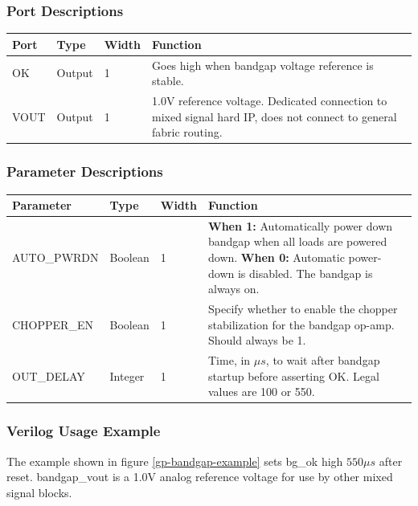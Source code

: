 \documentclass{article}
\begin{document}
\subsubsection{Port Descriptions}

\begin{tabularx}{5in}{|l|l|l|X|}
\hline
{\bfseries Port} & {\bfseries Type} & {\bfseries Width} & {\bfseries Function} \\
\hline
OK & Output & 1 & Goes high when bandgap voltage reference is stable. \\
\hline
VOUT & Output & 1 & 1.0V reference voltage.
	Dedicated connection to mixed signal hard IP, does not connect to general fabric routing. \\
\hline
\end{tabularx}

\subsubsection{Parameter Descriptions}

\begin{tabularx}{5in}{|l|l|l|X|}
\hline
{\bfseries Parameter} & {\bfseries Type} & {\bfseries Width} & {\bfseries Function} \\
\hline
AUTO\_PWRDN & Boolean & 1 &
	{\bfseries When 1: } \newline Automatically power down bandgap when all loads are powered down. \newline
	{\bfseries When 0: } \newline Automatic power-down is disabled. The bandgap is always on.\\
\hline
CHOPPER\_EN & Boolean & 1 &
	Specify whether to enable the chopper stabilization for the bandgap op-amp. Should always be 1. \\
\hline
OUT\_DELAY & Integer & 1 &
	Time, in $\mu s$, to wait after bandgap startup before asserting OK. Legal values are 100 or 550.\\
\hline
\end{tabularx}

\subsubsection{Verilog Usage Example}

The example shown in figure \ref{gp-bandgap-example} sets bg\_ok high $550 \mu s$ after reset. bandgap\_vout is a 1.0V 
analog reference voltage for use by other mixed signal blocks.
\end{document}
